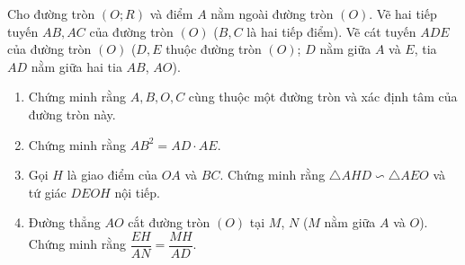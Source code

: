 \begin{bt}%
	Cho đường tròn $(O; R)$ và điểm $A$ nằm ngoài đường tròn $(O)$. Vẽ hai tiếp tuyến $AB, AC$ của đường tròn $(O)$ ($B, C$ là hai tiếp điểm). Vẽ cát tuyến $ADE$ của đường tròn $(O) $ ($D, E$ thuộc đường tròn $(O)$; $D$ nằm giữa $A$ và $E$, tia $AD$ nằm giữa hai tia $AB$, $AO$).
	\begin{enumerate}
		\item   Chứng minh rằng $A, B, O, C$ cùng thuộc một đường tròn và xác định tâm của đường tròn này.
		\item  Chứng minh rằng  $AB^2 = AD\cdot AE$.
		\item  Gọi $H$ là giao điểm của $OA$ và $BC$. Chứng minh rằng $\triangle AHD\backsim \triangle AEO$ và tứ giác $DEOH$ nội tiếp.
		\item  Đường thẳng $AO$ cắt đường tròn $(O)$ tại $M$, $N$ ($M$ nằm giữa $A$ và $O$). 
		Chứng minh rằng $\dfrac{EH}{AN}=\dfrac{MH}{AD}$.
	\end{enumerate}
	
	
\end{bt}
